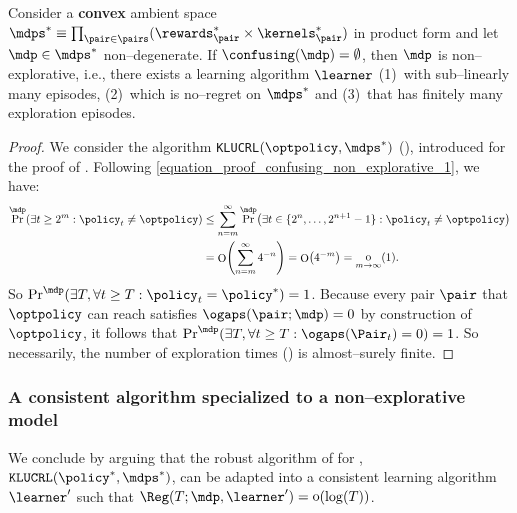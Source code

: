 \documentclass[preprint,cleveref,12pt]{colt2025}
\DeclarePairedDelimiter{\braces}{\{}{\}}	%
\DeclarePairedDelimiter{\parens}{(}{)}	%
\def\product{\prod}
\DeclareMathOperator*{\oh}{\mathrm{o}}
\DeclareMathOperator*{\OH}{\mathrm{O}}
\def\model{\mdp}
\def\models{\mdps}
\newcommand{\strong}[1]{\textbf{#1}}
\begin{document}
    \begin{proposition}
    \label{proposition_confusing_empty_non_explorative}
        Consider a \strong{convex} ambient space $\models^* \equiv \product_{\pair \in \pairs} (\rewards^*_\pair \times \kernels^*_\pair)$ in product form and let $\model \in \models^*$ non--degenerate.
        If $\confusing(\model) = \emptyset$, then $\model$ is non--explorative, i.e., there exists a learning algorithm $\learner$ 
        (1)~with sub--linearly many episodes,
        (2)~which is no--regret on $\models^*$ and
        (3)~that has finitely many exploration episodes. 
    \end{proposition}
    \begin{proof}
        We consider the algorithm \texttt{KLUCRL}$(\optpolicy, \models^*)$ (), introduced for the proof of . 
        Following \eqref{equation_proof_confusing_non_explorative_1}, we have:
        \begin{align*}
            \Pr^\model \parens*{
                \exists t \ge 2^m
                :
                \policy_t \ne \optpolicy
            }
            & \le 
            \sum_{n = m}^\infty 
            \Pr^\model \parens*{
                \exists t \in \braces{2^n, \ldots, 2^{n+1}-1}
                :
                \policy_t \ne \optpolicy
            }
            \\
            & =
            \OH \parens*{
                \sum_{n = m}^\infty 4^{-n}
            }
            = \OH \parens*{4^{-m}}
            = \oh_{m \to \infty}(1)
            .
        \end{align*}
        So $\Pr^\model\parens{\exists T, \forall t \ge T: \policy_t = \policy^*} = 1$. 
        Because every pair $\pair$ that $\optpolicy$ can reach satisfies $\ogaps(\pair; \model) = 0$ by construction of $\optpolicy$, it follows that $\Pr^\model\parens{\exists T, \forall t \ge T: \ogaps(\Pair_t) = 0} = 1$. 
        So necessarily, the number of exploration times () is almost--surely finite.
    \end{proof}

    \subsubsection{A consistent algorithm specialized to a non--explorative model}

    We conclude by arguing that the robust algorithm of for , $\texttt{KLUCRL}(\policy^*, \models^*)$, can be adapted into a consistent learning algorithm $\learner'$ such that $\Reg(T; \model, \learner') = \oh(\log(T))$. 
\end{document}
